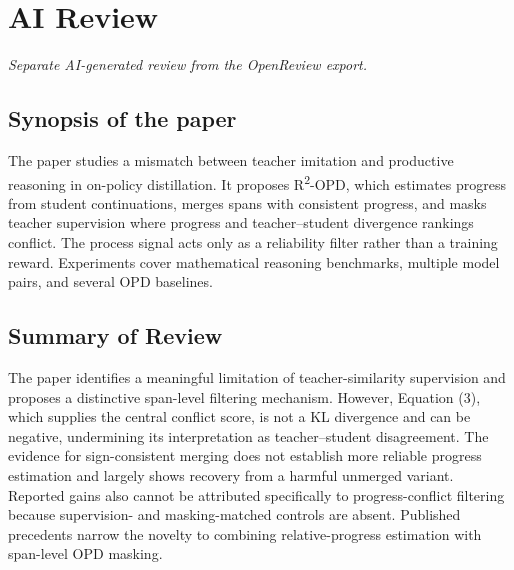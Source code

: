 \documentclass[11pt,a4paper]{article}
\begin{document}
\clearpage
\appendix

\section{AI Review}
\label{reviewer:ai}
\noindent\textit{Separate AI-generated review from the OpenReview export.}

\subsection*{Synopsis of the paper}
The paper studies a mismatch between teacher imitation and productive reasoning in on-policy distillation. It proposes R\textsuperscript{2}-OPD, which estimates progress from student continuations, merges spans with consistent progress, and masks teacher supervision where progress and teacher--student divergence rankings conflict. The process signal acts only as a reliability filter rather than a training reward. Experiments cover mathematical reasoning benchmarks, multiple model pairs, and several OPD baselines.

\subsection*{Summary of Review}
The paper identifies a meaningful limitation of teacher-similarity supervision and proposes a distinctive span-level filtering mechanism. However, Equation (3), which supplies the central conflict score, is not a KL divergence and can be negative, undermining its interpretation as teacher--student disagreement. The evidence for sign-consistent merging does not establish more reliable progress estimation and largely shows recovery from a harmful unmerged variant. Reported gains also cannot be attributed specifically to progress-conflict filtering because supervision- and masking-matched controls are absent. Published precedents narrow the novelty to combining relative-progress estimation with span-level OPD masking.
\end{document}
